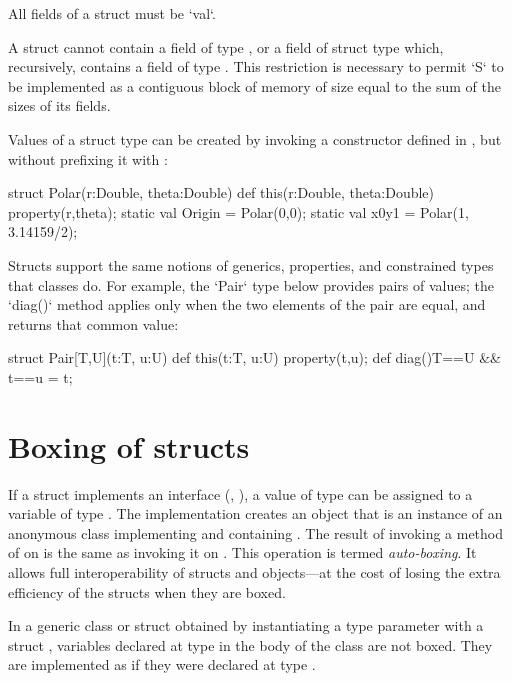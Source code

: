 All fields of a struct must be \xcd`val`.

A struct  cannot contain a field of type , or a field of struct
type  which, recursively, contains a field of type .  This
restriction is necessary to permit \xcd`S` to be implemented as a contiguous
block of memory of size equal to the sum of the sizes of its fields.  


Values of a struct  type can be created by invoking a constructor
defined in , but without prefixing it with : 
\begin{xten}
struct Polar(r:Double, theta:Double){
  def this(r:Double, theta:Double) {property(r,theta);}
  static val Origin = Polar(0,0);
  static val x0y1 = Polar(1, 3.14159/2);
}
\end{xten}
%

Structs support the same notions of generics, properties, and constrained
types that classes do.  For example, the \xcd`Pair` type below provides pairs
of values; the \xcd`diag()` method applies only when the two elements of the
pair are equal, and returns that common value: 
\begin{xten}
struct Pair[T,U](t:T, u:U) {
  def this(t:T, u:U) { property(t,u); }
  def diag(){T==U && t==u} = t;
}
\end{xten}
%


\section{Boxing of structs}
\label{auto-boxing} 
If a struct  implements an interface  (\eg, ),
a value  of type  can be assigned to a variable of type
. The implementation creates an object  that is an
instance of an anonymous class implementing  and containing
.  The result of invoking a method of  on  is the
same as invoking it on . This operation is termed {\em auto-boxing}.
It allows full interoperability of structs and objects---at the cost of losing
the extra efficiency of the structs when they are boxed.

In a generic class or struct obtained by instantiating a type parameter
 with a struct , variables declared at type  in the body
of the class are not boxed. They are implemented as if they were declared at
type .


